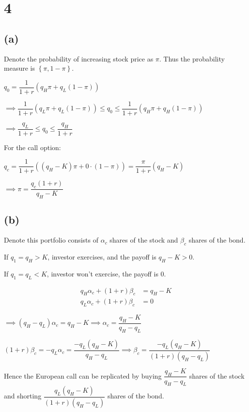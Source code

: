 \documentclass{article}
\begin{document}
\section*{4}

\subsection*{(a)}

Denote the probability of increasing stock price as $\pi$. Thus the probability measure is $\left\{\pi, 1-\pi\right\}$.

$q_{0}=\dfrac{1}{1+r}\left(q_{H}\pi+q_{L}\left(1-\pi\right)\right)$

$\implies \dfrac{1}{1+r}\left(q_{L}\pi+q_{L}\left(1-\pi\right)\right)\leqslant q_{0}\leqslant\dfrac{1}{1+r}\left(q_{H}\pi+q_{H}\left(1-\pi\right)\right)$

$\implies \boxed{\dfrac{q_{L}}{1+r}\leqslant q_{0}\leqslant\dfrac{q_{H}}{1+r}}$

For the call option:

$q_{c}=\dfrac{1}{1+r}\left(\left(q_{H}-K\right)\pi+0\cdot\left(1-\pi\right)\right)=\dfrac{\pi}{1+r}\left(q_{H}-K\right)$

$\implies\pi=\dfrac{q_{c}\left(1+r\right)}{q_{H}-K}$

\subsection*{(b)}

Denote this portfolio consists of $\alpha_{c}$ shares of the stock and $\beta_{c}$ shares of the bond.

If $q_{1}=q_{H}>K$, investor exercises, and the payoff is $q_{H}-K>0$.

If $q_{1}=q_{L}<K$, investor won't exercise, the payoff is $0$. 

\begin{align*} 
    q_{H}\alpha_{c} + \left(1+r\right)\beta_{c} &=  q_{H}-K \\ 
    q_{L}\alpha_{c} + \left(1+r\right)\beta_{c} &=  0
\end{align*}

$\implies \left(q_{H}-q_{L}\right)\alpha_{c}=q_{H}-K\implies\alpha_{c}=\dfrac{q_{H}-K}{q_{H}-q_{L}}$

$\left(1+r\right)\beta_{c}=-q_{L}\alpha_{c}=\dfrac{-q_{L}\left(q_{H}-K\right)}{q_{H}-q_{L}}\implies\beta_{c}=\dfrac{-q_{L}\left(q_{H}-K\right)}{\left(1+r\right)\left(q_{H}-q_{L}\right)}$

Hence the European call can be replicated by buying $\dfrac{q_{H}-K}{q_{H}-q_{L}}$ shares of the stock and shorting $\dfrac{q_{L}\left(q_{H}-K\right)}{\left(1+r\right)\left(q_{H}-q_{L}\right)}$ shares of the bond.
\end{document}
